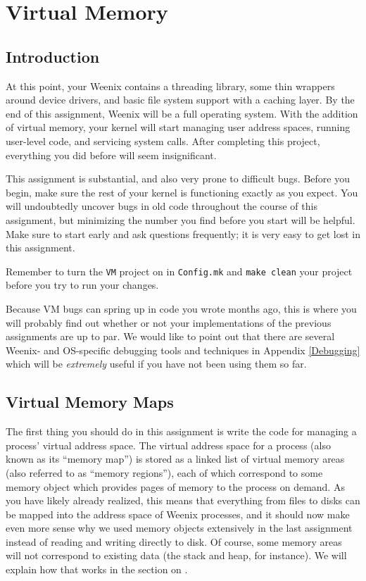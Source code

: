 \chapter{Virtual Memory}
\label{vm}

\section{Introduction}

At this point, your Weenix contains a threading library, some thin wrappers around device drivers, and basic file system support with a caching layer. By the end of this assignment, Weenix will be a full operating system. With the addition of virtual memory, your kernel will start managing user address spaces, running user-level code, and servicing system calls. After completing this project, everything you did before will seem insignificant.

This assignment is substantial, and also very prone to difficult bugs. Before you begin, make sure the rest of your kernel is functioning exactly as you expect. You will undoubtedly uncover bugs in old code throughout the course of this assignment, but minimizing the number you find before you start will be helpful. Make sure to start early and ask questions frequently; it is very easy to get lost in this assignment.

Remember to turn the \texttt{VM} project on in \texttt{Config.mk} and \texttt{make clean} your project before you try to run your changes.

Because VM bugs can spring up in code you wrote months ago, this is where you will probably find out whether or not your implementations of the previous assignments are up to par. We would like to point out that there are several Weenix- and OS-specific debugging tools and techniques in Appendix \ref{Debugging} which will be \textit{extremely} useful if you have not been using them so far.

\section{Virtual Memory Maps}

The first thing you should do in this assignment is write the code for managing a process' virtual address space. The virtual address space for a process (also known as its ``memory map'') is stored as a linked list of virtual memory areas (also referred to as ``memory regions''), each of which correspond to some memory object which provides pages of memory to the process on demand. As you have likely already realized, this means that everything from files to disks can be mapped into the address space of Weenix processes, and it should now make even more sense why we used memory objects extensively in the last assignment instead of reading and writing directly to disk. Of course, some memory areas will not correspond to existing data (the stack and heap, for instance). We will explain how that works in the section on .

